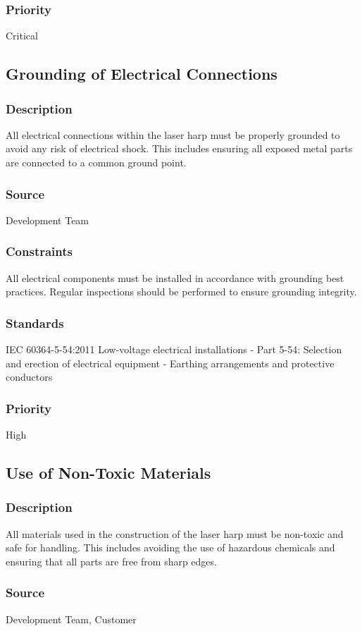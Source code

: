\subsubsection{Priority}
Critical

\subsection{Grounding of Electrical Connections}
\subsubsection{Description}
All electrical connections within the laser harp must be properly grounded to avoid any risk of electrical shock. This includes ensuring all exposed metal parts are connected to a common ground point.
\subsubsection{Source}
Development Team
\subsubsection{Constraints}
All electrical components must be installed in accordance with grounding best practices. Regular inspections should be performed to ensure grounding integrity.
\subsubsection{Standards}
IEC 60364-5-54:2011 Low-voltage electrical installations - Part 5-54: Selection and erection of electrical equipment - Earthing arrangements and protective conductors
\subsubsection{Priority}
High

\subsection{Use of Non-Toxic Materials}
\subsubsection{Description}
All materials used in the construction of the laser harp must be non-toxic and safe for handling. This includes avoiding the use of hazardous chemicals and ensuring that all parts are free from sharp edges.
\subsubsection{Source}
Development Team, Customer

